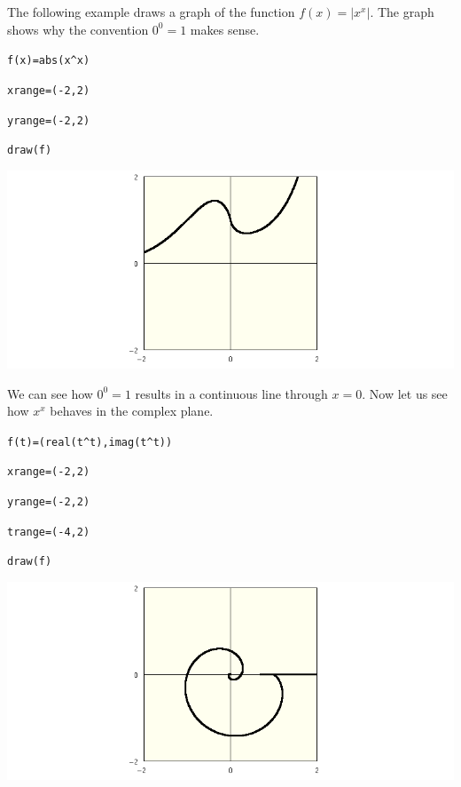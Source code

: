 \section{}

The following example draws a graph of the function $f(x)=|x^x|$.
The graph shows why the convention $0^0=1$ makes sense.

\medskip
\verb$f(x)=abs(x^x)$

\verb$xrange=(-2,2)$

\verb$yrange=(-2,2)$

\verb$draw(f)$

\begin{center}
\includegraphics[scale=0.4]{zerozero.png}
\end{center}

\medskip
\noindent
We can see how $0^0=1$ results in a continuous line through $x=0$.
Now let us see how $x^x$ behaves in the complex plane.

\medskip
\verb$f(t)=(real(t^t),imag(t^t))$

\verb$xrange=(-2,2)$

\verb$yrange=(-2,2)$

\verb$trange=(-4,2)$

\verb$draw(f)$

\begin{center}
\includegraphics[scale=0.4]{zerozero2.png}
\end{center}
